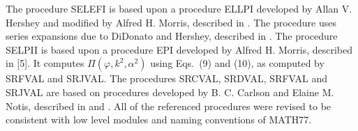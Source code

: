 \documentclass[twoside]{MATH77}
\begin{document}
The procedure SELEFI is based upon a procedure ELLPI developed by Allan V.
Hershey and modified by Alfred H.  Morris, described in
\cite{ahm:lib:ELLPI}.  The procedure uses series expansions due to
DiDonato and Hershey, described in \cite{DiDonato:1959:NFC}.  The
procedure SELPII is based upon a procedure EPI developed by Alfred H.
Morris, described in [5].  It computes $\Pi (\varphi ,k^2,\alpha ^2)$
using Eqs.~(9) and (10), as computed by SRFVAL and SRJVAL.  The procedures
SRCVAL, SRDVAL, SRFVAL and SRJVAL are based on procedures developed by B.
C.  Carlson and Elaine M.  Notis, described in \cite{Carlson:1979:CEI} and
\cite{Carlson:1981:AAI}.  All of the referenced procedures were revised to
be consistent with low level modules and naming conventions of MATH77.
\vspace{10pt}
\end{document}
